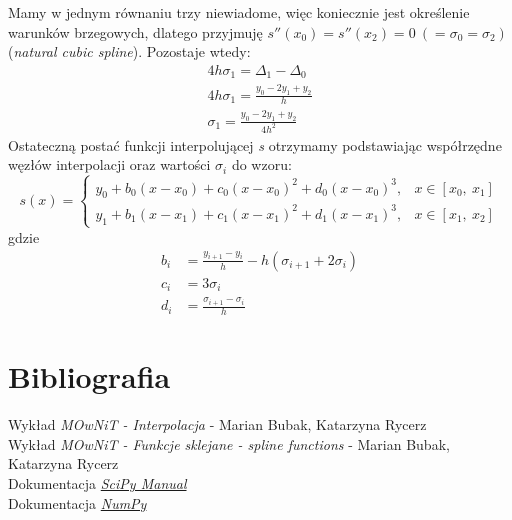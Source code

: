 \documentclass{article}
\begin{document}
Mamy w jednym równaniu trzy niewiadome, więc koniecznie jest określenie warunków brzegowych, dlatego przyjmuję \(s''(x_0) = s''(x_2) = 0\ (= \sigma_0 = \sigma_2)\) (\textit{natural cubic spline}). Pozostaje wtedy:
\begin{gather*}
    4h\sigma_1 = \Delta_1 - \Delta_0\\
    4h\sigma_1 = \frac{y_0 - 2y_1 + y_2}{h}\\
    \sigma_1 = \frac{y_0 - 2y_1 + y_2}{4h^2}
\end{gather*}
Ostateczną postać funkcji interpolującej \textit{s} otrzymamy podstawiając współrzędne węzłów interpolacji oraz wartości \(\sigma_i\) do wzoru:
\[s(x) = 
\begin{cases}
    y_0 + b_0(x - x_0) + c_0(x - x_0)^2 + d_0(x - x_0)^3, & x \in [x_0,\ x_1]\\
    y_1 + b_1(x - x_1) + c_1(x - x_1)^2 + d_1(x - x_1)^3, & x \in [x_1,\ x_2]
\end{cases}
\]
gdzie
\begin{align*}
    b_i &= \frac{y_{i+1} - y_i}{h} - h(\sigma_{i+1} + 2\sigma_i)\\
    c_i &= 3\sigma_i\\
    d_i &= \frac{\sigma_{i+1} - \sigma_i}{h}
\end{align*}

\section{Bibliografia}
Wykład \textit{MOwNiT - Interpolacja} - Marian Bubak, Katarzyna Rycerz\\
Wykład \textit{MOwNiT - Funkcje sklejane - spline functions} - Marian Bubak, Katarzyna Rycerz\\
Dokumentacja \href{https://docs.scipy.org/doc/scipy/reference/generated/scipy.interpolate.krogh_interpolate.html#scipy.interpolate.krogh_interpolate}{\textit{SciPy Manual}}\\
Dokumentacja \href{https://numpy.org/doc/stable/reference/generated/numpy.polynomial.polynomial.Polynomial.html#numpy.polynomial.polynomial.Polynomial}{\textit{NumPy}}
\end{document}
